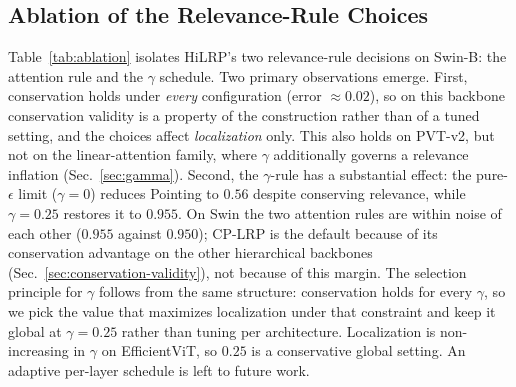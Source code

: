\documentclass[lettersize,journal]{IEEEtran}
\theoremstyle{definition}
\theoremstyle{plain}
\begin{document}
\subsection{Ablation of the Relevance-Rule Choices}
\label{sec:ablation}
Table~\ref{tab:ablation} isolates HiLRP's two relevance-rule decisions on Swin-B: the attention rule and the $\gamma$ schedule. Two primary observations emerge. First, conservation holds under \emph{every} configuration (error ${\approx}0.02$), so on this backbone conservation validity is a property of the construction rather than of a tuned setting, and the choices affect \emph{localization} only. This also holds on PVT-v2, but not on the linear-attention family, where $\gamma$ additionally governs a relevance inflation (Sec.~\ref{sec:gamma}). Second, the $\gamma$-rule has a substantial effect: the pure-$\epsilon$ limit ($\gamma{=}0$) reduces Pointing to $0.56$ despite conserving relevance, while $\gamma{=}0.25$ restores it to $0.955$. On Swin the two attention rules are within noise of each other ($0.955$ against $0.950$); CP-LRP is the default because of its conservation advantage on the other hierarchical backbones (Sec.~\ref{sec:conservation-validity}), not because of this margin. The selection principle for $\gamma$ follows from the same structure: conservation holds for every $\gamma$, so we pick the value that maximizes localization under that constraint and keep it global at $\gamma{=}0.25$ rather than tuning per architecture. Localization is non-increasing in $\gamma$ on EfficientViT, so $0.25$ is a conservative global setting. An adaptive per-layer schedule is left to future work.
\end{document}
